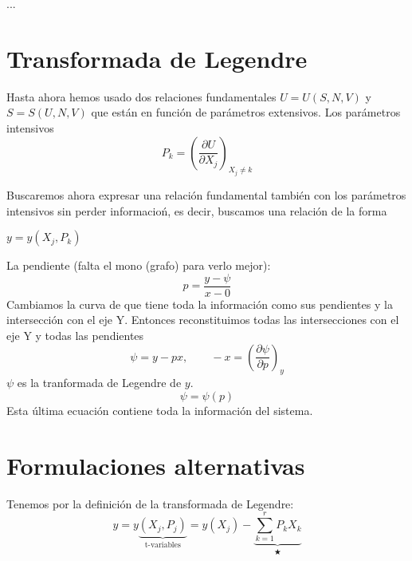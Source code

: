 \documentclass[10pt,twocolumn]{IEEEtran2e}
\begin{document}
% 
% 

...

\section{Transformada de Legendre}
Hasta ahora hemos usado dos relaciones fundamentales $U=U(S,N,V)$ y $S=S(U,N,V)$ que est\'an en funci\'on de par\'ametros extensivos. Los par\'ametros intensivos
\begin{equation}
 P_{k}=\left( \frac{\partial U}{\partial X_{j}}\right)_{X_{j}\neq k}
\end{equation}

Buscaremos ahora expresar una relaci\'on fundamental tambi\'en con los par\'ametros intensivos sin perder informacio\'n, es decir, buscamos una relaci\'on de la forma 

$y=y(X_{j},P_{k})$

La pendiente (falta el mono (grafo) para verlo mejor):
\begin{equation}
 p=\frac{y-\psi}{x -0}
\end{equation}
Cambiamos la curva de que tiene toda la informaci\'on como sus pendientes y la intersecci\'on con el eje Y. Entonces reconstituimos todas las intersecciones con el eje Y y todas las pendientes
\begin{equation}
 \psi=y-px,\qquad-x=\left( \frac{\partial \psi}{\partial p} \right)_{y}
\end{equation}
$\psi$ es la tranformada de Legendre de $y$.
\begin{equation}
 \psi=\psi(p)
\end{equation}
Esta \'ultima ecuaci\'on contiene toda la informaci\'on del sistema.

\section{Formulaciones alternativas}
Tenemos por la definici\'on de la transformada de Legendre:
\begin{equation}
 y=y\underbrace{(X_{j},P_{j})}_{\textrm{t-variables}}=y(X_{j}) - \underbrace{\sum_{k=1}^{r}P_{k}X_{k}}_{\bigstar}
\end{equation}
\end{document}
